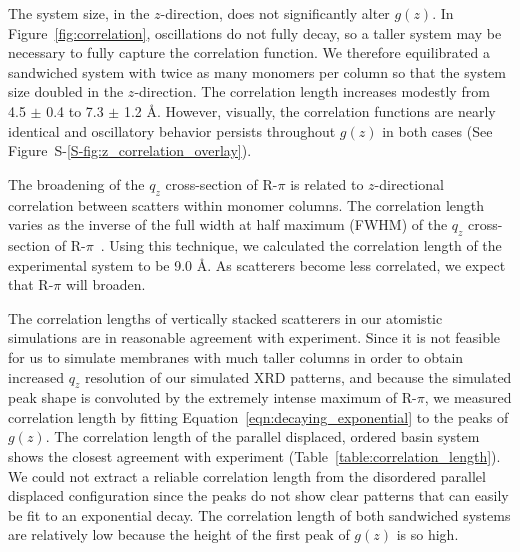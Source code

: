 \documentclass[journal=jpcbfk,manuscript=article]{achemso}
\begin{document}
  The system size, in the $z$-direction, does not significantly alter $g(z)$.
  In Figure~\ref{fig:correlation}, oscillations do not fully decay, so a taller
  system may be necessary to fully capture the correlation function. We therefore
  equilibrated a sandwiched system with twice as many monomers per column so that
  the system size doubled in the $z$-direction. The correlation length increases
  modestly from 4.5 $\pm$ 0.4 to 7.3 $\pm$ 1.2 \AA. However, visually, the
  correlation functions are nearly identical and oscillatory behavior persists
  throughout $g(z)$ in both cases (See
  Figure~S-\ref{S-fig:z_correlation_overlay}).

  The broadening of the $q_z$ cross-section of R-$\pi$ is related to
  $z$-directional correlation between scatters within monomer columns. The
  correlation length varies as the inverse of the full width at half maximum
  (FWHM) of the $q_z$ cross-section of R-$\pi$~\cite{young_highly_2013-1}. Using
  this technique, we calculated the correlation length of the experimental 
  system to be 9.0 \AA. As scatterers become less correlated, we expect that
  R-$\pi$ will broaden.

  The correlation lengths of vertically stacked scatterers in our atomistic
  simulations are in reasonable agreement with experiment. Since it is not
  feasible for us to simulate membranes with much taller columns in order to
  obtain increased $q_z$ resolution of our simulated XRD patterns, and because
  the simulated peak shape is convoluted by the extremely intense maximum of
  R-$\pi$, we measured correlation length by fitting
  Equation~\ref{eqn:decaying_exponential} to the peaks of $g(z)$. The correlation
  length of the parallel displaced, ordered basin system shows the closest
  agreement with experiment (Table~\ref{table:correlation_length}). 
  We could not extract a reliable correlation length from the disordered
  parallel displaced configuration since the peaks do not show clear patterns
  that can easily be fit to an exponential decay. The correlation length of both
  sandwiched systems are relatively low because the height of the first peak of
  $g(z)$ is so high. 
  
\end{document}
